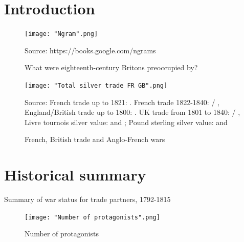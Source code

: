 \documentclass[12pt,a4paper,notitlepage,english]{article}
\newcommand{\source}[1]{\caption*{\footnotesize Source: {#1}} }
\begin{document}
\pagebreak

\renewcommand{\baselinestretch}{1.0}\normalsize




\clearpage


\begin{appendix}



\section{Introduction}

\begin{figure}[h!]
	\caption{What were eighteenth-century Britons preoccupied by?}
	\centering
	\texttt{[image: "Ngram".png]}
	\source{https://books.google.com/ngrams}
	\label{Ngram}
\end{figure}



\begin{figure}[h!]
\caption{French, British trade and Anglo-French wars}
\centering
\texttt{[image: "Total silver trade FR GB".png]}
\source{French trade up to 1821: \cite{Daudin2020}. French trade 1822-1840: \cite{Federico2016} / \cite{Dedinger2017},
England/British trade up to 1800: \cite{Deane1969}. UK trade from 1801 to 1840: \cite{Federico2016} / \cite{Dedinger2017},
Livre tournois silver value: \cite{Dewailly1857} and \cite{Hoffman2000}; Pound sterling silver value: \cite{Clark2006} and \cite{Jastram1981}}
\label{FrBritTrade}
\end{figure}

\section{Historical summary}

\begin{table}[h!]
\centering
\caption{Summary of war status for trade partners, 1792-1815}\label{war_peace}

\end{table} 

\begin{center}
\begin{figure}[h!]
\caption{Number of protagonists}
\label{Number_of_protagonists}
\centering
\texttt{[image: "Number of protagonists".png]}
\end{figure}
\end{center}


\end{appendix}
\end{document}

